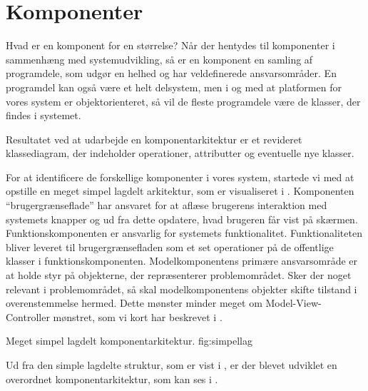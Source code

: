 \section{Komponenter}
\label{sec:komponenter}
Hvad er en komponent for en størrelse? Når der hentydes til komponenter i sammenhæng med systemudvikling, så er en komponent en samling af programdele, som udgør en helhed og har veldefinerede ansvarsområder. En programdel kan også være et helt delsystem, men i og med at platformen for vores system er objektorienteret, så vil de fleste programdele være de klasser, der findes i systemet. 

Resultatet ved at udarbejde en komponentarkitektur er et revideret klassediagram, der indeholder operationer, attributter og eventuelle nye klasser.

For at identificere de forskellige komponenter i vores system, startede vi med at opstille en meget simpel lagdelt arkitektur, som er visualiseret i . 
Komponenten ``brugergrænseflade'' har ansvaret for at aflæse brugerens interaktion med systemets knapper og ud fra dette opdatere, hvad brugeren får vist på skærmen. 
Funktionskomponenten er ansvarlig for systemets funktionalitet. Funktionaliteten bliver leveret til brugergrænsefladen som et set operationer på de offentlige klasser i funktionskomponenten. 
Modelkomponentens primære ansvarsområde er at holde styr på objekterne, der repræsenterer problemområdet. Sker der noget relevant i problemområdet, så skal modelkomponentens objekter skifte tilstand i overenstemmelse hermed. 
Dette mønster minder meget om Model-View-Controller mønstret, som vi kort har beskrevet i .

	{Meget simpel lagdelt komponentarkitektur.}
	{fig:simpellag}

Ud fra den simple lagdelte struktur, som er vist i , er der blevet udviklet en overordnet komponentarkitektur, som kan ses i .



